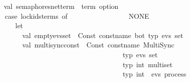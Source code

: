 \begin{isabellebody}
\isanewline
\ \isanewline
\ \ \ \ \ \ \ \ \ \ val\ semaphores{\isacharunderscore}{\kern0pt}net{\isacharunderscore}{\kern0pt}term\ {\isacharcolon}{\kern0pt}\ term\ option\ {\isacharequal}{\kern0pt}\isanewline
\ \ \ \ \ \ \ \ \ \ \ \ {\isacharparenleft}{\kern0pt}case\ lock{\isacharunderscore}{\kern0pt}ids{\isacharunderscore}{\kern0pt}terms\ of\isanewline
\ \ \ \ \ \ \ \ \ \ \ \ \ \ \ {\isacharbrackleft}{\kern0pt}{\isacharbrackright}{\kern0pt}\ {\isacharequal}{\kern0pt}{\isachargreater}{\kern0pt}\ NONE\isanewline
\ \ \ \ \ \ \ \ \ \ \ \ \ {\isacharbar}{\kern0pt}\ {\isacharunderscore}{\kern0pt}\ {\isacharequal}{\kern0pt}{\isachargreater}{\kern0pt}\isanewline
\ \ \ \ \ \ \ \ \ \ \ \ \ \ \ let\isanewline
\ \ \ \ \ \ \ \ \ \ \ \ \ \ \ \ \ val\ empty{\isacharunderscore}{\kern0pt}evs{\isacharunderscore}{\kern0pt}set\ {\isacharequal}{\kern0pt}\ Const\ {\isacharparenleft}{\kern0pt}{\isacharat}{\kern0pt}{\isacharbraceleft}{\kern0pt}const{\isacharunderscore}{\kern0pt}name\ bot{\isacharbraceright}{\kern0pt}{\isacharcomma}{\kern0pt}\ {\isacharat}{\kern0pt}{\isacharbraceleft}{\kern0pt}typ\ {\isachardoublequote}{\kern0pt}evs\ set{\isachardoublequote}{\kern0pt}{\isacharbraceright}{\kern0pt}{\isacharparenright}{\kern0pt}\isanewline
\ \ \ \ \ \ \ \ \ \ \ \ \ \ \ \ \ val\ multisync{\isacharunderscore}{\kern0pt}const\ {\isacharequal}{\kern0pt}\ Const\ {\isacharparenleft}{\kern0pt}{\isacharat}{\kern0pt}{\isacharbraceleft}{\kern0pt}const{\isacharunderscore}{\kern0pt}name\ MultiSync{\isacharbraceright}{\kern0pt}{\isacharcomma}{\kern0pt}\ \isanewline
\ \ \ \ \ \ \ \ \ \ \ \ \ \ \ \ \ \ \ \ \ \ \ \ \ \ \ \ \ \ \ \ \ \ \ \ \ \ \ \ \ \ \ \ \ \ {\isacharat}{\kern0pt}{\isacharbraceleft}{\kern0pt}typ\ {\isachardoublequote}{\kern0pt}evs\ set{\isachardoublequote}{\kern0pt}{\isacharbraceright}{\kern0pt}\ {\isacharminus}{\kern0pt}{\isacharminus}{\kern0pt}{\isachargreater}{\kern0pt}\ \isanewline
\ \ \ \ \ \ \ \ \ \ \ \ \ \ \ \ \ \ \ \ \ \ \ \ \ \ \ \ \ \ \ \ \ \ \ \ \ \ \ \ \ \ \ \ \ \ {\isacharat}{\kern0pt}{\isacharbraceleft}{\kern0pt}typ\ {\isachardoublequote}{\kern0pt}int\ multiset{\isachardoublequote}{\kern0pt}{\isacharbraceright}{\kern0pt}\ {\isacharminus}{\kern0pt}{\isacharminus}{\kern0pt}{\isachargreater}{\kern0pt}\ \isanewline
\ \ \ \ \ \ \ \ \ \ \ \ \ \ \ \ \ \ \ \ \ \ \ \ \ \ \ \ \ \ \ \ \ \ \ \ \ \ \ \ \ \ \ \ \ \ {\isacharat}{\kern0pt}{\isacharbraceleft}{\kern0pt}typ\ {\isachardoublequote}{\kern0pt}int\ {\isasymRightarrow}\ {\isacharparenleft}{\kern0pt}evs{\isacharparenright}{\kern0pt}\ process{\isachardoublequote}{\kern0pt}{\isacharbraceright}{\kern0pt}\ {\isacharminus}{\kern0pt}{\isacharminus}{\kern0pt}{\isachargreater}{\kern0pt}\ \isanewline

\end{isabellebody}
